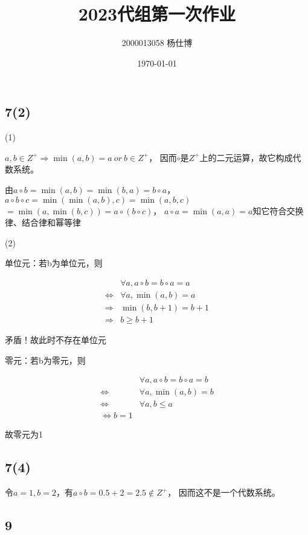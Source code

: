 \documentclass[UTF8]{ctexart}
\title{\vspace{-4cm}2023代组第一次作业}
\author{2000013058 杨仕博}
\date{\today}
\begin{document}
\maketitle

\subsection*{7(2)}

(1)

$a, b\in Z^+ \Rightarrow \min(a, b) = a\ or\ b\in Z^+$，
因而$\circ$是$Z^+$上的二元运算，故它构成代数系统。

由$a\circ b = \min(a, b) = \min(b, a) = b\circ a$，
$a\circ b \circ c = \min(\min(a, b), c) = \min(a, b, c)$
$= \min(a, \min(b, c)) = a\circ (b\circ c)$，
$a\circ a = \min(a, a) = a$知它符合交换律、结合律和幂等律

(2)

单位元：若b为单位元，则

\[
\begin{aligned}
    &\forall a, a\circ b = b\circ a = a\\
    \Leftrightarrow &\forall a, \min(a, b) = a\\
    \Rightarrow &\min(b, b + 1) = b + 1\\
    \Rightarrow &b \geq b + 1
\end{aligned}    
\]

矛盾！故此时不存在单位元

零元：若b为零元，则

\[
\begin{aligned}    
    &\forall a, a\circ b = b\circ a = b\\
    \Leftrightarrow &\forall a, \min(a, b) = b\\
    \Leftrightarrow &\forall a, b\leq a\\
    \Leftrightarrow b = 1
\end{aligned}    
\]

故零元为1

\subsection*{7(4)}

令$a = 1, b = 2$，有$a\circ b = 0.5 + 2 = 2.5\notin Z^+$，
因而这不是一个代数系统。

\subsection*{9}
\end{document}
